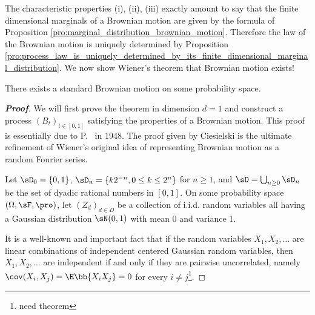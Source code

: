 The characteristic properties (i), (ii), (iii) exactly amount to say that the finite dimensional marginals of a Brownian motion are given by the formula of Proposition \ref{pro:marginal_distribution_brownian_motion}. Therefore the law of the Brownian motion is uniquely determined by Proposition \ref{pro:process_law_is_uniquely_determined_by_its_finite_dimensional_marginal_distribution}. We now show Wiener's theorem that Brownian motion exists!

\begin{theorem}\label{thm:wiener_brownian_motion_existence}
There exists a standard Brownian motion on some probability space.
\end{theorem}

\begin{proof}[\bf Proof]
We will first prove the theorem in dimension $d = 1$ and construct a process $(B_t)_{t\in [0,1]}$ satisfying the properties of a Brownian motion. This proof is essentially due to P. \levy\ in 1948. The proof given by Ciesielski\cite{Ciesielski_1961} is the ultimate refinement of Wiener's original idea of representing Brownian motion as a random Fourier series.


Let $\sD_0 = \{0, 1\}$, $\sD_n = \{k2^{-n}, 0 \leq k \leq 2^n\}$ for $n \geq 1$, and $\sD = \bigcup_{n\geq 0} \sD_n$ be the set of dyadic rational numbers in $[0, 1]$. On some probability space $(\Omega,\sF,\pro)$, let $(Z_d)_{d \in D}$ be a collection of i.i.d. random variables all having a Gaussian distribution $\sN(0, 1)$ with mean 0 and variance 1.

It is a well-known and important fact that if the random variables $X_1,X_2,\dots$ are linear combinations of independent centered Gaussian random variables, then $X_1,X_2,\dots$ are independent if and only if they are pairwise uncorrelated, namely $\cov(X_i,X_j) = \E\bb{X_iX_j} = 0$ for every $i \neq j$\footnote{need theorem}.

\end{proof}
